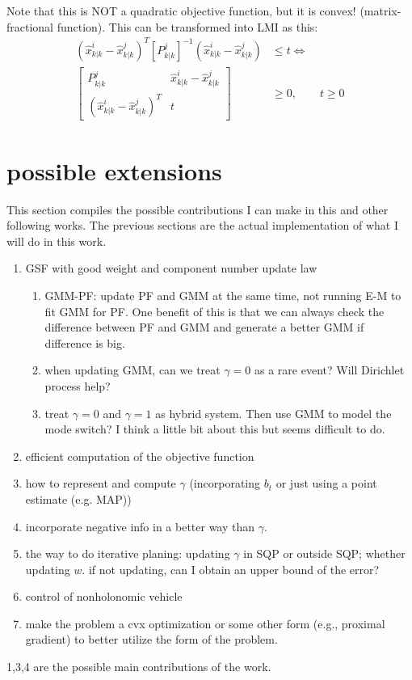 \documentclass[letterpaper, 10 pt, conference]{ieeeconf}  %
\begin{document}
Note that this is NOT a quadratic objective function, but it is convex! (matrix-fractional function).
This can be transformed into LMI as this:
\begin{align*}
(\hat{x}^i_{k|k}-\hat{x}^j_{k|k})^T[P^j_{k|k}]^{-1}(\hat{x}^i_{k|k}-\hat{x}^j_{k|k})&\leq t \iff\\
\begin{bmatrix}
P^j_{k|k} & \hat{x}^i_{k|k}-\hat{x}^j_{k|k}\\
(\hat{x}^i_{k|k}-\hat{x}^j_{k|k})^T & t
\end{bmatrix}&\geq 0,\qquad t\geq 0
\end{align*}




\section{possible extensions}
This section compiles the possible contributions I can make in this and other following works. The previous sections are the actual implementation of what I will do in this work.
\begin{enumerate}
	\item GSF with good weight and component number update law
		\begin{enumerate}
			\item GMM-PF: update PF and GMM at the same time, not running E-M to fit GMM for PF. One benefit of this is that we can always check the difference between PF and GMM and generate a better GMM if difference is big.
			\item when updating GMM, can we treat $\gamma=0$ as a rare event? Will Dirichlet process help?
			\item treat $\gamma=0$ and $\gamma=1$ as hybrid system. Then use GMM to model the mode switch? I think a little bit about this but seems difficult to do.
		\end{enumerate}
	\item efficient computation of the objective function
	\item how to represent and compute $\gamma$ (incorporating $b_t$ or just using a point estimate (e.g. MAP))
	\item incorporate negative info in a better way than $\gamma$.
	\item the way to do iterative planing: updating $\gamma$ in SQP or outside SQP; whether updating $w$. if not updating, can I obtain an upper bound of the error?
	\item control of nonholonomic vehicle
	\item make the problem a cvx optimization or some other form (e.g., proximal gradient) to better utilize the form of the problem.
\end{enumerate}
1,3,4 are the possible main contributions of the work.
\end{document}
